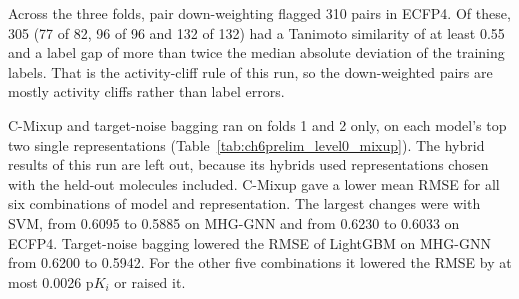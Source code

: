 \begin{table}[htbp]
\label{tab:ch6prelim_level0}
\end{table}

Across the three folds, pair down-weighting flagged 310 pairs in ECFP4. Of these, 305 (77 of 82, 96 of 96 and 132 of 132) had a Tanimoto similarity of at least 0.55 and a label gap of more than twice the median absolute deviation of the training labels. That is the activity-cliff rule of this run, so the down-weighted pairs are mostly activity cliffs rather than label errors.

C-Mixup and target-noise bagging ran on folds 1 and 2 only, on each model's top two single representations (Table~\ref{tab:ch6prelim_level0_mixup}). The hybrid results of this run are left out, because its hybrids used representations chosen with the held-out molecules included. C-Mixup gave a lower mean RMSE for all six combinations of model and representation. The largest changes were with SVM, from 0.6095 to 0.5885 on MHG-GNN and from 0.6230 to 0.6033 on ECFP4. Target-noise bagging lowered the RMSE of LightGBM on MHG-GNN from 0.6200 to 0.5942. For the other five combinations it lowered the RMSE by at most 0.0026 p$K_i$ or raised it.

